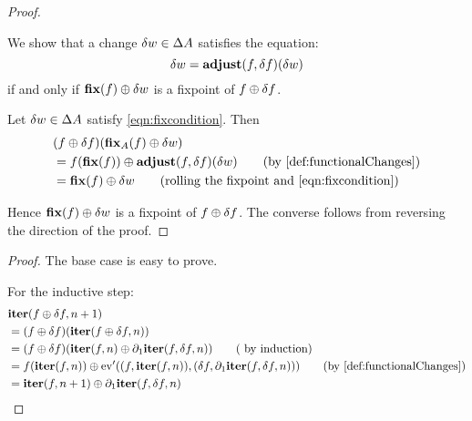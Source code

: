 \fixpointPseudoDerivatives*
\begin{proof}
  \label{prf:fixpointPseudoDerivatives}
  
  We show that a change $\delta w \in \Delta A$ satisfies
  the equation:
  \begin{equation}\label{eqn:fixcondition}
    \delta w = \mathbf{adjust}(f, \delta f)(\delta w)
  \end{equation}
  if and only if $\mathbf{fix}(f) \oplus \delta w$ is a fixpoint of $f \oplus \delta f$.

  Let $\delta w \in \Delta A$ satisfy \cref{eqn:fixcondition}. Then
  \begin{align*}
    &(f \cplus \change{f})(\fixpoint_A(f) \cplus \change{w})\\
    &= f(\fixpoint(f))
    \cplus
    \adjust(f, \change{f})(\change{w})
    \tag{by \cref{def:functionalChanges}}\\
    &= \fixpoint(f)
    \cplus
    \change{w}
    \tag{rolling the fixpoint and \cref{eqn:fixcondition}}
  \end{align*}

  Hence $\mathbf{fix}(f) \oplus \delta w$ is a fixpoint of $f \oplus \delta f$. The converse
  follows from reversing the direction of the proof.
\end{proof}

\iterDerivativesF*
\begin{proof}
  \label{prf:iterDerivativesF}
  The base case is easy to prove.

  For the inductive step:
  \begin{align*}
    &\iter(f \cplus \change{f}, n + 1)\\
    &=(f \cplus \change{f})(\iter(f \cplus \change{f}, n))\\
    &= (f \cplus \change{f})(
        \iter(f, n)
        \cplus \partial_1{\iter}(f, \change{f}, n)
      )
    \tag{ by induction}\\
    &= f(\iter(f, n)) \cplus \derive{\ev}((f, \iter(f, n)), (\change{f},
      \partial_1{\iter}(f, \change{f}, n)))
    \tag{by \cref{def:functionalChanges}}\\
    & =\iter(f, n + 1) \cplus \partial_1{\iter}(f, \change{f}, n)
  \end{align*}
\end{proof}

